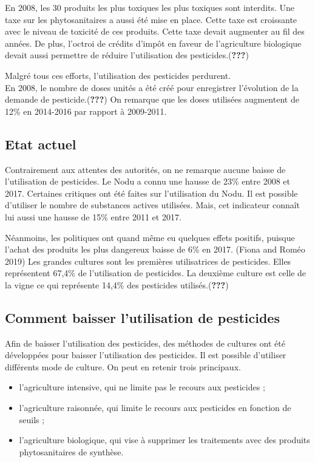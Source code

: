 \documentclass[11pt,]{article}
\providecommand{\tightlist}{%
  \setlength{\itemsep}{0pt}\setlength{\parskip}{0pt}}
\begin{document}
En 2008, les 30 produits les plus toxiques les plus toxiques sont
interdits. Une taxe sur les phytosanitaires a aussi été mise en place.
Cette taxe est croissante avec le niveau de toxicité de ces produits.
Cette taxe devait augmenter au fil des années. De plus, l'octroi de
crédits d'impôt en faveur de l'agriculture biologique devait aussi
permettre de réduire l'utilisation des pesticides.({\textbf{???}})

Malgré tous ces efforts, l'utilisation des pesticides perdurent.\\
En 2008, le nombre de doses unités a été créé pour enregistrer
l'évolution de la demande de pesticide.({\textbf{???}}) On remarque que
les doses utilisées augmentent de 12\% en 2014-2016 par rapport à
2009-2011.

\hypertarget{etat-actuel}{%
\subsection{Etat actuel}\label{etat-actuel}}

Contrairement aux attentes des autorités, on ne remarque aucune baisse
de l'utilisation de pesticides. Le Nodu a connu une hausse de 23\% entre
2008 et 2017. Certaines critiques ont été faites sur l'utilisation du
Nodu. Il est possible d'utiliser le nombre de substances actives
utilisées. Mais, cet indicateur connaît lui aussi une hausse de 15\%
entre 2011 et 2017.

Néanmoins, les politiques ont quand même eu quelques effets positifs,
puisque l'achat des produits les plus dangereux baisse de 6\% en 2017.
(Fiona and Roméo 2019) Les grandes cultures sont les premières
utilisatrices de pesticides. Elles représentent 67,4\% de l'utilisation
de pesticides. La deuxième culture est celle de la vigne ce qui
représente 14,4\% des pesticides utilisés.({\textbf{???}})

\hypertarget{comment-baisser-lutilisation-de-pesticides}{%
\subsection{Comment baisser l'utilisation de
pesticides}\label{comment-baisser-lutilisation-de-pesticides}}

Afin de baisser l'utilisation des pesticides, des méthodes de cultures
ont été développées pour baisser l'utilisation des pesticides. Il est
possible d'utiliser différents mode de culture. On peut en retenir trois
principaux.

\begin{itemize}
\tightlist
\item
  l'agriculture intensive, qui ne limite pas le recours aux pesticides ;
\item
  l'agriculture raisonnée, qui limite le recours aux pesticides en
  fonction de seuils ;
\item
  l'agriculture biologique, qui vise à supprimer les traitements avec
  des produits phytosanitaires de synthèse.
\end{itemize}
\end{document}
